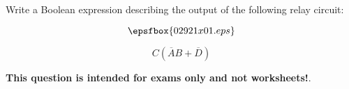 

Write a Boolean expression describing the output of the following relay circuit:

$$\epsfbox{02921x01.eps}$$







$$C(\overline{A}B + \overline{D})$$







{\bf This question is intended for exams only and not worksheets!}.




